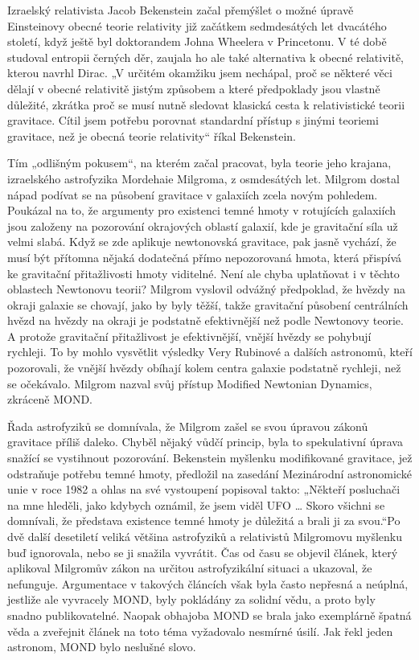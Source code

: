   Izraelský relativista Jacob Bekenstein začal přemýšlet o možné úpravě Einsteinovy obecné teorie
  relativity již začátkem sedmdesátých let dvacátého století, když ještě byl doktorandem Johna
  Wheelera v Princetonu. V té době studoval entropii černých děr, zaujala ho ale také alternativa k
  obecné relativitě, kterou navrhl Dirac. „V určitém okamžiku jsem nechápal, proč se některé věci
  dělají v obecné relativitě jistým způsobem a které předpoklady jsou vlastně důležité, zkrátka proč
  se musí nutně sledovat klasická cesta k relativistické teorii gravitace. Cítil jsem potřebu
  porovnat standardní přístup s jinými teoriemi gravitace, než je obecná teorie relativity“ říkal
  Bekenstein. 
  
  Tím „odlišným pokusem“, na kterém začal pracovat, byla teorie jeho krajana, izraelského
  astrofyzika Mordehaie Milgroma, z osmdesátých let. Milgrom dostal nápad podívat se na působení
  gravitace v galaxiích zcela novým pohledem. Poukázal na to, že argumenty pro existenci temné hmoty
  v rotujících galaxiích jsou založeny na pozorování okrajových oblastí galaxií, kde je gravitační
  síla už velmi slabá. Když se zde aplikuje newtonovská gravitace, pak jasně vychází, že musí být
  přítomna nějaká dodatečná přímo nepozorovaná hmota, která přispívá ke gravitační přitažlivosti
  hmoty viditelné. Není ale chyba uplatňovat i v těchto oblastech Newtonovu teorii? Milgrom vyslovil
  odvážný předpoklad, že hvězdy na okraji galaxie se chovají, jako by byly těžší, takže gravitační
  působení centrálních hvězd na hvězdy na okraji je podstatně efektivnější než podle Newtonovy
  teorie. A protože gravitační přitažlivost je efektivnější, vnější hvězdy se pohybují rychleji. To
  by mohlo vysvětlit výsledky Very Rubinové a dalších astronomů, kteří pozorovali, že vnější hvězdy
  obíhají kolem centra galaxie podstatně rychleji, než se očekávalo. Milgrom nazval svůj přístup
  Modified Newtonian Dynamics, zkráceně MOND. 
  
  Řada astrofyziků se domnívala, že Milgrom zašel se svou úpravou zákonů gravitace příliš daleko.
  Chyběl nějaký vůdčí princip, byla to spekulativní úprava snažící se vystihnout pozorování.
  Bekenstein myšlenku modifikované gravitace, jež odstraňuje potřebu temné hmoty, předložil na
  zasedání Mezinárodní astronomické unie v roce 1982 a ohlas na své vystoupení popisoval takto:
  „Někteří posluchači na mne hleděli, jako kdybych oznámil, že jsem viděl UFO … Skoro všichni se
  domnívali, že představa existence temné hmoty je důležitá a brali ji za svou.“Po dvě další
  desetiletí veliká většina astrofyziků a relativistů Milgromovu myšlenku buď ignorovala, nebo se ji
  snažila vyvrátit. Čas od času se objevil článek, který aplikoval Milgromův zákon na určitou
  astrofyzikální situaci a ukazoval, že nefunguje. Argumentace v takových článcích však byla často
  nepřesná a neúplná, jestliže ale vyvracely MOND, byly pokládány za solidní vědu, a proto byly
  snadno publikovatelné. Naopak obhajoba MOND se brala jako exemplárně špatná věda a zveřejnit
  článek na toto téma vyžadovalo nesmírné úsilí. Jak řekl jeden astronom, MOND bylo neslušné slovo.
  
